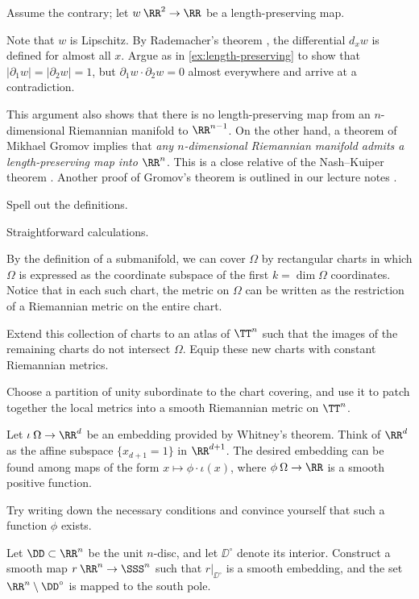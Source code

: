  Assume the contrary;
let $w\:\RR^2\to \RR$ be a length-preserving map.

Note that $w$ is Lipschitz.
By Rademacher's theorem \cite{rademacher}, the differential $d_xw$ is defined for  almost all $x$.
Argue as in \ref{ex:length-preserving} to show that $|\partial_1w|=|\partial_2w|=1$, but $\partial_1w\cdot \partial_2w=0$ almost everywhere and arrive at a contradiction.

 This argument also shows that there is no length-preserving map from an $n$-dimensional Riemannian manifold to $\RR^{n-1}$.
On the other hand, a theorem of Mikhael Gromov \cite[Section~2.4.11]{gromov-1986} implies that \textit{any $n$-dimensional Riemannian manifold admits a length-preserving map into $\RR^n$}.
This is a close relative of the Nash--Kuiper theorem \cite{nash-1954,kuiper-1955}.
Another proof of Gromov's theorem is outlined in our lecture notes \cite{petrunin-yashinski}.

 Spell out the definitions.

Straightforward calculations.


By the definition of a submanifold, we can cover $\Omega$ by rectangular charts in which $\Omega$ is expressed as the coordinate subspace of the first $k=\dim \Omega$ coordinates.
Notice that in each such chart, the metric on $\Omega$ can be written as the restriction of a Riemannian metric on the entire chart.

Extend this collection of charts to an atlas of $\TT^n$ such that the images of the remaining charts do not intersect $\Omega$.
Equip these new charts with constant Riemannian metrics.

Choose a partition of unity subordinate to the chart covering, and use it to patch together the local metrics into a smooth Riemannian metric on $\TT^n$.

Let $\iota\:\Omega\to\RR^d$ be an embedding provided by Whitney's theorem.
Think of $\RR^d$ as the affine subspace $\{x_{d+1} = 1\}$ in $\RR^{d+1}$.
The desired embedding can be found among maps of the form $x \mapsto \phi \cdot \iota(x)$, where $\phi\:\Omega \to \RR$ is a smooth positive function.

Try writing down the necessary conditions and convince yourself that such a function $\phi$ exists.

Let $\DD \subset \RR^n$ be the unit $n$-disc, and let $\DD^\circ$ denote its interior.
Construct a smooth map $r\:\RR^n \to \SSS^n$ such that $r|_{\DD^\circ}$ is a smooth embedding, and the set $\RR^n \setminus \DD^\circ$ is mapped to the south pole.


